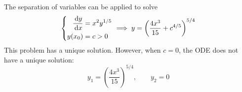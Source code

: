 The separation of variables can be applied to solve
\[
\left\{
\begin{aligned}
\frac{\,\mathrm{d} y}{\,\mathrm{d} x}&=x^{2}y^{1/5}\\
y(x_0)&=c>0
\end{aligned}
\right.
\implies 
y=\left(
\frac{4x^3}{15}+c^{4/5}
\right)^{5/4}
\]
This problem has a unique solution. However, when $c=0$, the ODE does not have a unique solution:
\[
y_1=(\frac{4x^3}{15})^{5/4},\qquad
y_2=0
\]










